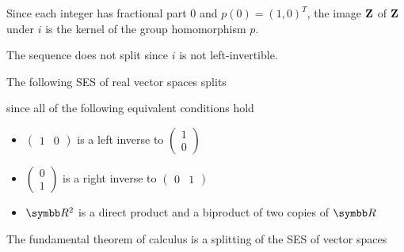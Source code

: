 \begin{example}
\begin{defenum}
    Since each integer has fractional part \( 0 \) and \( p(0) = (1, 0)^T \), the image \( \operatorname{\mathbf{Z}} \) of \( \operatorname{\mathbf{Z}} \) under \( i \) is the kernel of the group homomorphism \( p \).

    The sequence does not split since \( i \) is not left-invertible.

    \item\label{ex:short_exact_sequences/vector_space_sum} The following SES of real vector spaces splits
    \begin{Center}
    \end{Center}
    since all of the following equivalent conditions hold
    \begin{itemize}
      \item \( \begin{pmatrix}1 & 0\end{pmatrix} \) is a left inverse to \( \begin{pmatrix}1 \\ 0\end{pmatrix} \)
      \item \( \begin{pmatrix}0 \\ 1\end{pmatrix} \) is a right inverse to \( \begin{pmatrix}0 & 1\end{pmatrix} \)
      \item \( \BB{R}^2 \) is a direct product and a biproduct of two copies of \( \BB{R} \)
    \end{itemize}

    \item\label{ex:short_exact_sequences/fundamental_theorem_of_calculus} The fundamental theorem of calculus is a splitting of the SES of vector spaces
    \begin{Center}
    \end{Center}
  \end{defenum}
\end{example}


